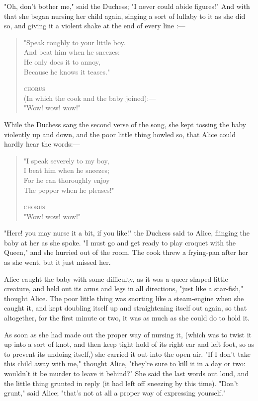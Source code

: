 "Oh, don't bother me," said the Duchess; "I never could abide figures!" And with that she began nursing her child again, singing a sort of ​lullaby to it as she did so, and giving it a violent shake at the end of every line :—

\begin{quote}
"Speak roughly to your little boy.\\
⁠And beat him when he sneezes:\\
He only does it to annoy,\\
⁠Because he knows it teases."

\textsc{chorus}\\
(In which the cook and the baby joined):—\\
"Wow! wow! wow!"
\end{quote}

While the Duchess sang the second verse of the song, she kept tossing the baby violently up and down, and the poor little thing howled so, that Alice could hardly hear the words:—

\begin{quote}
"I speak severely to my boy,\\
⁠I beat him when he sneezes;\\
For he can thoroughly enjoy\\
⁠The pepper when he pleases!"

\textsc{chorus}\\
"Wow! wow! wow!"
\end{quote}

​"Here! you may nurse it a bit, if you like!" the Duchess said to Alice, flinging the baby at her as she spoke. "I must go and get ready to play croquet with the Queen," and she hurried out of the room. The cook threw a frying-pan after her as she went, but it just missed her.

Alice caught the baby with some difficulty, as it was a queer-shaped little creature, and held out its arms and legs in all directions, "just like a star-fish," thought Alice. The poor little thing was snorting like a steam-engine when she caught it, and kept doubling itself up and straightening itself out again, so that altogether, for the first minute or two, it was as much as she could do to hold it.

As soon as she had made out the proper way of nursing it, (which was to twist it up into a sort of knot, and then keep tight hold of its right ear and left foot, so as to prevent its undoing itself,) she carried it out into the open air. "If I don't take this child away with me," thought Alice, "they're sure to kill it in a day ​or two: wouldn't it be murder to leave it behind?" She said the last words out loud, and the little thing grunted in reply (it had left off sneezing by this time). "Don't grunt," said Alice; "that's not at all a proper way of expressing yourself."

